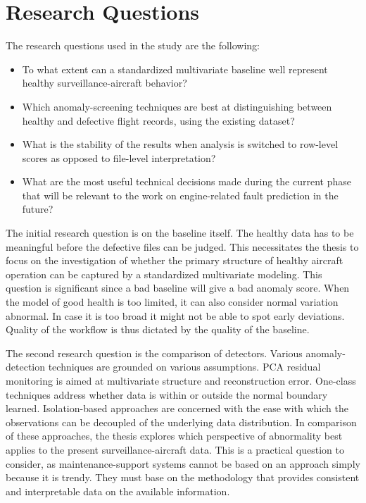 \documentclass[12pt,a4paper]{report}
\begin{document}
	\section{Research Questions}
	
	The research questions used in the study are the following:
	
	\begin{itemize}
		\item To what extent can a standardized multivariate baseline well represent healthy surveillance-aircraft behavior?
		\item Which anomaly-screening techniques are best at distinguishing between healthy and defective flight records, using the existing dataset?
		\item What is the stability of the results when analysis is switched to row-level scores as opposed to file-level interpretation?
		\item What are the most useful technical decisions made during the current phase that will be relevant to the work on engine-related fault prediction in the future?
	\end{itemize}
	
	The initial research question is on the baseline itself. The healthy data has to be meaningful before the defective files can be judged. This necessitates the thesis to focus on the investigation of whether the primary structure of healthy aircraft operation can be captured by a standardized multivariate modeling. This question is significant since a bad baseline will give a bad anomaly score. When the model of good health is too limited, it can also consider normal variation abnormal. In case it is too broad it might not be able to spot early deviations. Quality of the workflow is thus dictated by the quality of the baseline.
	
	The second research question is the comparison of detectors. Various anomaly-detection techniques are grounded on various assumptions. PCA residual monitoring is aimed at multivariate structure and reconstruction error. One-class techniques address whether data is within or outside the normal boundary learned. Isolation-based approaches are concerned with the ease with which the observations can be decoupled of the underlying data distribution. In comparison of these approaches, the thesis explores which perspective of abnormality best applies to the present surveillance-aircraft data. This is a practical question to consider, as maintenance-support systems cannot be based on an approach simply because it is trendy. They must base on the methodology that provides consistent and interpretable data on the available information.
	
\end{document}
